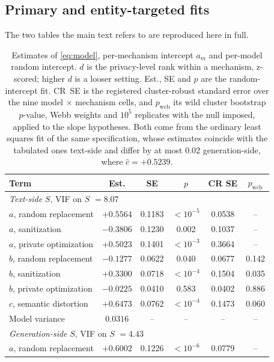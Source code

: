 \subsection{\label{apx:mainfits}Primary and entity-targeted fits}
The two tables the main text refers to are reproduced here in full.

\begin{table}[t]
  \centering
  \caption{Estimates of \eqref{eq:model}, per-mechanism intercept $a_m$ and per-model random intercept.
  $d$ is the privacy-level rank within a mechanism,
  z-scored;
  higher $d$ is a looser setting.
  Est.,
  SE and $p$ are the random-intercept fit.
  CR~SE is the registered cluster-robust standard error over the nine model $\times$ mechanism cells,
  and $p_{\text{wcb}}$ its wild cluster bootstrap $p$-value,
  Webb weights and $10^5$ replicates with the null imposed,
  applied to the slope hypotheses.
  Both come from the ordinary least squares fit of the same specification,
  whose estimates coincide with the tabulated ones text-side and differ by at most $0.02$ generation-side,
  where $\hat c = +0.5239$.}
  \label{tab:mainfit}
  \begin{tabular}{lccccc}
    \toprule
    Term & Est. & SE & $p$ & CR SE & $p_{\text{wcb}}$ \\
    \midrule
    \multicolumn{6}{l}{\textit{Text-side} $S$, VIF on $S$ $= 8.07$} \\
    $a$, random replacement     & $+0.5564$ & 0.1183 & $<10^{-5}$ & 0.0538 & -- \\
    $a$, sanitization           & $-0.3806$ & 0.1230 & 0.002 & 0.1037 & -- \\
    $a$, private optimization   & $+0.5023$ & 0.1401 & $<10^{-3}$ & 0.3664 & -- \\
    $b$, random replacement     & $-0.1277$ & 0.0622 & 0.040 & 0.0677 & 0.142 \\
    $b$, sanitization           & $+0.3300$ & 0.0718 & $<10^{-4}$ & 0.1504 & 0.035 \\
    $b$, private optimization   & $-0.0225$ & 0.0410 & 0.583 & 0.0402 & 0.886 \\
    $c$, semantic distortion    & $+0.6473$ & 0.0762 & $<10^{-4}$ & 0.1473 & 0.060 \\
    Model variance              & $0.0316$ & -- & -- & -- & -- \\
    \midrule
    \multicolumn{6}{l}{\textit{Generation-side} $S$, VIF on $S$ $= 4.43$} \\
    $a$, random replacement     & $+0.6002$ & 0.1226 & $<10^{-6}$ & 0.0779 & -- \\

\end{tabular}
\end{table}
